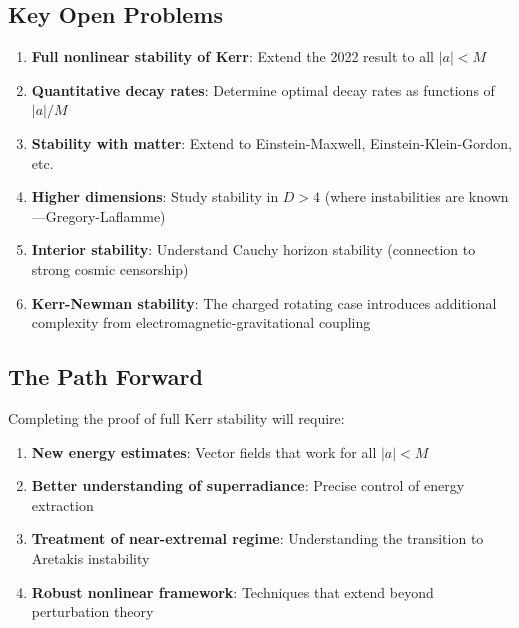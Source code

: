\documentclass[12pt,a4paper]{article}
\begin{document}
\subsection{Key Open Problems}

\begin{enumerate}
    \item \textbf{Full nonlinear stability of Kerr}: Extend the 2022 result to all $|a| < M$
    
    \item \textbf{Quantitative decay rates}: Determine optimal decay rates as functions of $|a|/M$
    
    \item \textbf{Stability with matter}: Extend to Einstein-Maxwell, Einstein-Klein-Gordon, etc.
    
    \item \textbf{Higher dimensions}: Study stability in $D > 4$ (where instabilities are known---Gregory-Laflamme)
    
    \item \textbf{Interior stability}: Understand Cauchy horizon stability (connection to strong cosmic censorship)
    
    \item \textbf{Kerr-Newman stability}: The charged rotating case introduces additional complexity from electromagnetic-gravitational coupling
\end{enumerate}

\subsection{The Path Forward}

Completing the proof of full Kerr stability will require:

\begin{enumerate}
    \item \textbf{New energy estimates}: Vector fields that work for all $|a| < M$
    
    \item \textbf{Better understanding of superradiance}: Precise control of energy extraction
    
    \item \textbf{Treatment of near-extremal regime}: Understanding the transition to Aretakis instability
    
    \item \textbf{Robust nonlinear framework}: Techniques that extend beyond perturbation theory
\end{enumerate}
\end{document}
